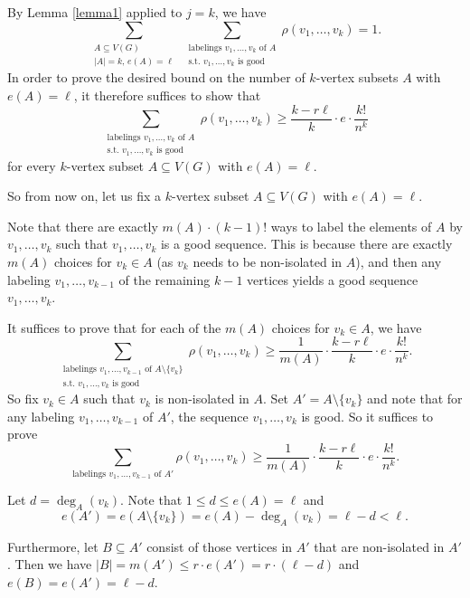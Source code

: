 \documentclass[11pt]{article}
\theoremstyle{definition}
\numberwithin{equation}{section}
\begin{document}
By Lemma \ref{lemma1} applied to $j=k$, we have
\[\sum_{\substack{A\subseteq V(G)\\\vert A\vert=k,\, e(A)=\ell}}\ \sum_{\substack{\text{labelings }v_1,\dots, v_k\text{ of } A\\\text{s.t.\ }v_1,\dots, v_k\text{ is good}}}\rho(v_1,\dots,v_k)= 1.\]
In order to prove the desired bound on the number of $k$-vertex subsets $A$ with $e(A)=\ell$, it therefore suffices to show that
\[\sum_{\substack{\text{labelings }v_1,\dots, v_k\text{ of } A\\\text{s.t.\ }v_1,\dots, v_k\text{ is good}}}\rho(v_1,\dots,v_k)\geq \frac{k-r\ell}{k}\cdot e\cdot \frac{k!}{n^k}\]
for every $k$-vertex subset $A\subseteq V(G)$ with $e(A)=\ell$.

So from now on, let us fix a $k$-vertex subset $A\subseteq V(G)$ with $e(A)=\ell$. 

Note that there are exactly $m(A)\cdot (k-1)!$ ways to label the elements of $A$ by $v_1,\dots,v_k$ such that $v_1,\dots,v_k$ is a good sequence. This is because there are exactly $m(A)$ choices for $v_k\in A$ (as $v_k$ needs to be non-isolated in $A$), and then any labeling $v_1,\dots,v_{k-1}$ of the remaining $k-1$ vertices yields a good sequence $v_1,\dots,v_k$.

It suffices to prove that for each of the $m(A)$ choices for $v_k\in A$, we have
\[\sum_{\substack{\text{labelings }v_1,\dots, v_{k-1}\text{ of } A\setminus \lbrace v_k\rbrace\\\text{s.t.\ }v_1,\dots, v_k\text{ is good}}}\rho(v_1,\dots,v_k)\geq \frac{1}{m(A)} \cdot \frac{k-r\ell}{k}\cdot e\cdot \frac{k!}{n^k}.\]
So fix $v_k\in A$ such that $v_k$ is non-isolated in $A$. Set $A'=A\setminus \lbrace v_k\rbrace$ and note that for any labeling $v_1,\dots, v_{k-1}$ of $A'$, the sequence $v_1,\dots, v_{k}$ is good. So it suffices to prove
\begin{equation}\label{inequality}
\sum_{\text{labelings }v_1,\dots, v_{k-1}\text{ of } A'}\rho(v_1,\dots,v_k)\geq \frac{1}{m(A)} \cdot \frac{k-r\ell}{k}\cdot e\cdot \frac{k!}{n^k}.
\end{equation}

Let $d=\deg_A(v_k)$. Note that $1\leq d\leq e(A)=\ell$ and
\[e(A')=e(A\setminus \lbrace v_k\rbrace)=e(A)-\deg_A(v_k)=\ell-d<\ell.\]

Furthermore, let $B\subseteq A'$ consist of those vertices in $A'$ that are non-isolated in $A'$. Then we have $\vert B\vert=m(A')\leq r\cdot e(A')=r\cdot (\ell-d)$ and $e(B)=e(A')=\ell-d$.
\end{document}
